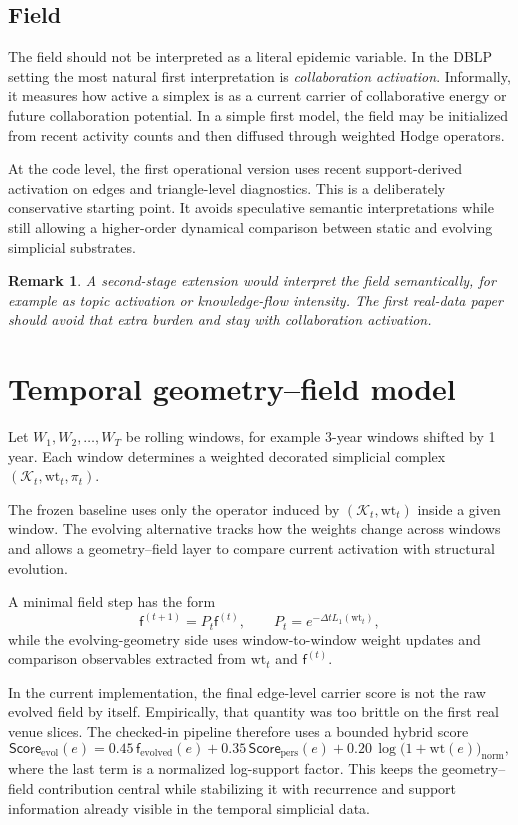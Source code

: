 \documentclass[11pt]{article}
\newtheorem{remark}[definition]{Remark}
\newcommand{\K}{\mathcal{K}}
\newcommand{\wt}{\mathrm{wt}}
\newcommand{\field}{\mathsf{f}}
\newcommand{\score}{\mathsf{Score}}
\begin{document}
\subsection*{Field}
The field should not be interpreted as a literal epidemic variable. In the DBLP setting the most natural first interpretation is \emph{collaboration activation}. Informally, it measures how active a simplex is as a current carrier of collaborative energy or future collaboration potential. In a simple first model, the field may be initialized from recent activity counts and then diffused through weighted Hodge operators.

At the code level, the first operational version uses recent support-derived activation on edges and triangle-level diagnostics. This is a deliberately conservative starting point. It avoids speculative semantic interpretations while still allowing a higher-order dynamical comparison between static and evolving simplicial substrates.

\begin{remark}
A second-stage extension would interpret the field semantically, for example as topic activation or knowledge-flow intensity. The first real-data paper should avoid that extra burden and stay with collaboration activation.
\end{remark}

\section{Temporal geometry--field model}
Let $W_1,W_2,\dots,W_T$ be rolling windows, for example 3-year windows shifted by 1 year. Each window determines a weighted decorated simplicial complex $(\K_t,\wt_t,\pi_t)$.

The frozen baseline uses only the operator induced by $(\K_t,\wt_t)$ inside a given window. The evolving alternative tracks how the weights change across windows and allows a geometry--field layer to compare current activation with structural evolution.

A minimal field step has the form
\[
\field^{(t+1)} = P_t\field^{(t)},
\qquad P_t = e^{-\Delta t L_1(\wt_t)},
\]
while the evolving-geometry side uses window-to-window weight updates and comparison observables extracted from $\wt_t$ and $\field^{(t)}$.

In the current implementation, the final edge-level carrier score is not the raw evolved field by itself. Empirically, that quantity was too brittle on the first real venue slices. The checked-in pipeline therefore uses a bounded hybrid score
\[
\score_{\mathrm{evol}}(e)
=
0.45\,\field_{\mathrm{evolved}}(e)
+
0.35\,\score_{\mathrm{pers}}(e)
+
0.20\,\log\!\bigl(1+\wt(e)\bigr)_{\mathrm{norm}},
\]
where the last term is a normalized log-support factor. This keeps the geometry--field contribution central while stabilizing it with recurrence and support information already visible in the temporal simplicial data.
\end{document}
